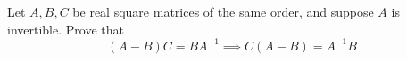 Let $A,B,C$ be real square matrices of the same order, and suppose $A$ is invertible. Prove that
\[ (A-B)C=BA^{-1}\implies C(A-B)=A^{-1}B \]